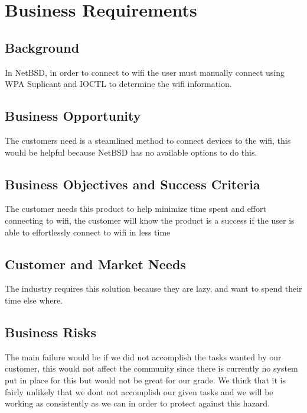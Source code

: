 \section{Business Requirements}
\subsection{Background}

In NetBSD, in order to connect to wifi the user must manually connect using WPA Suplicant and IOCTL to determine the wifi information. 

\subsection{Business Opportunity}

The customers need is a steamlined method to connect devices to the wifi, this would be helpful because NetBSD has no available options to do this.

\subsection{Business Objectives and Success Criteria}

The customer needs this product to help minimize time spent and effort connecting to wifi, the customer will know the product is a success if the user is able to effortlessly connect to wifi in less time

\subsection{Customer and Market Needs}

The industry requires this solution because they are lazy, and want to spend their time else where.

\subsection{Business Risks}

The main failure would be if we did not accomplish the tasks wanted by our customer, this would not affect the community since there is currently no system put in place for this but would not be great for our grade. We think that it is fairly unlikely that we dont not accomplish our given tasks and we will be working as consistently as we can in order to protect against this hazard.

